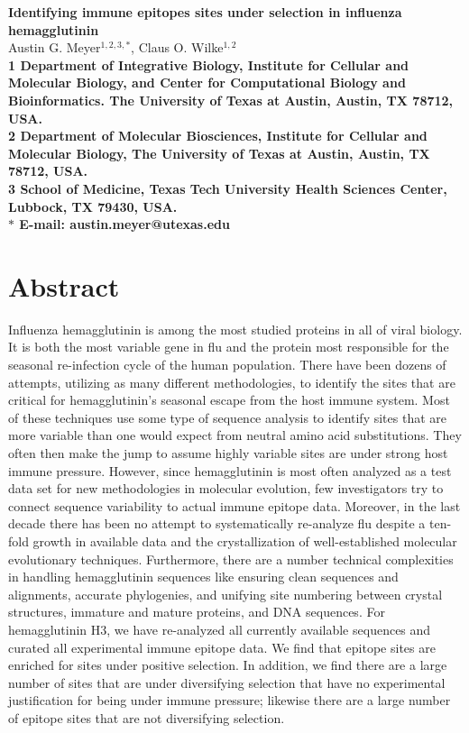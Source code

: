 \documentclass[10pt]{article}
\date{}
\begin{document}
\begin{flushleft}
{\Large
\textbf{Identifying immune epitopes sites under selection in influenza hemagglutinin}
}
\\
Austin G. Meyer$^{1,2,3, \ast}$, 
Claus O. Wilke$^{1,2}$
\\
\bf{1} Department of Integrative Biology, Institute for Cellular and Molecular Biology, and Center for Computational Biology and Bioinformatics. The University of Texas at Austin, Austin, TX 78712, USA.
\\
\bf{2} Department of Molecular Biosciences, Institute for Cellular and Molecular Biology, The University of Texas at Austin, Austin, TX 78712, USA.
\\
\bf{3} School of Medicine, Texas Tech University Health Sciences Center, Lubbock, TX 79430, USA.
\\
$\ast$ E-mail: austin.meyer@utexas.edu
\end{flushleft}

\section*{Abstract}
Influenza hemagglutinin is among the most studied proteins in all of viral biology. It is both the most variable gene in flu and the protein most responsible for the seasonal re-infection cycle of the human population. There have been dozens of attempts, utilizing as many different methodologies, to identify the sites that are critical for hemagglutinin's seasonal escape from the host immune system. Most of these techniques use some type of sequence analysis to identify sites that are more variable than one would expect from neutral amino acid substitutions. They often then make the jump to assume highly variable sites are under strong host immune pressure. However, since hemagglutinin is most often analyzed as a test data set for new methodologies in molecular evolution, few investigators try to connect sequence variability to actual immune epitope data. Moreover, in the last decade there has been no attempt to systematically re-analyze flu despite a ten-fold growth in available data and the crystallization of well-established molecular evolutionary techniques. Furthermore, there are a number technical complexities in handling hemagglutinin sequences like ensuring clean sequences and alignments, accurate phylogenies, and unifying site numbering between crystal structures, immature and mature proteins, and DNA sequences. For hemagglutinin H3, we have re-analyzed all currently available sequences and curated all experimental immune epitope data. We find that epitope sites are enriched for sites under positive selection. In addition, we find there are a large number of sites that are under diversifying selection that have no experimental justification for being under immune pressure; likewise there are a large number of epitope sites that are not diversifying selection. 
\end{document}
